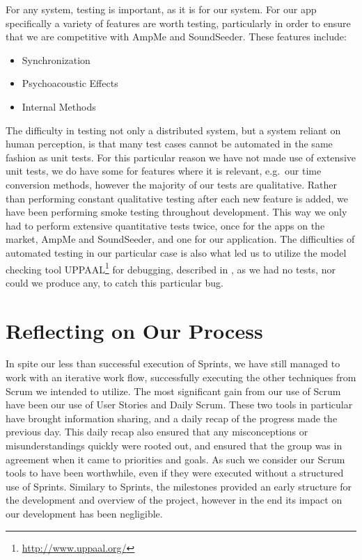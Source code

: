 \bigskip
For any system, testing is important, as it is for our system.
For our app specifically a variety of features are worth testing, particularly in order to ensure that we are competitive with AmpMe and SoundSeeder.
These features include:
\begin{multicols}{3}
\begin{itemize}
    \item Synchronization
    \item Psychoacoustic Effects
    \item Internal Methods
\end{itemize}
\end{multicols}

The difficulty in testing not only a distributed system, but a system reliant on human perception, is that many test cases cannot be automated in the same fashion as unit tests.
For this particular reason we have not made use of extensive unit tests, we do have some for features where it is relevant, e.g.\ our time conversion methods, however the majority of our tests are qualitative.
Rather than performing constant qualitative testing after each new feature is added, we have been performing smoke testing throughout development.
This way we only had to perform extensive quantitative tests twice, once for the apps on the market, AmpMe and SoundSeeder, and one for our application.
The difficulties of automated testing in our particular case is also what led us to utilize the model checking tool UPPAAL\footnote{\url{http://www.uppaal.org/}} for debugging, described in , as we had no tests, nor could we produce any, to catch this particular bug.

\section{Reflecting on Our Process}
In spite our less than successful execution of Sprints, we have still managed to work with an iterative work flow, successfully executing the other techniques from Scrum we intended to utilize.
The most significant gain from our use of Scrum have been our use of User Stories and Daily Scrum.
These two tools in particular have brought information sharing, and a daily recap of the progress made the previous day.
This daily recap also ensured that any misconceptions or misunderstandings quickly were rooted out, and ensured that the group was in agreement when it came to priorities and goals.
As such we consider our Scrum tools to have been worthwhile, even if they were executed without a structured use of Sprints.
Similary to Sprints, the milestones provided an early structure for the development and overview of the project, however in the end its impact on our development has been negligible.

